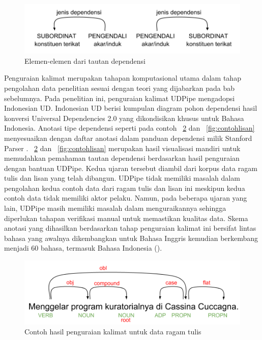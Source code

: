 \begin{figure}
	\centering \includegraphics[width=0.6
	\textwidth] {pics/tautandependensi.png} \caption{Elemen-elemen dari tautan dependensi} 
\label{fig:tautandependensi} \end{figure}

Penguraian kalimat merupakan tahapan komputasional utama dalam tahap pengolahan data penelitian sesuai dengan teori yang dijabarkan pada bab sebelumnya. Pada penelitian ini, penguraian kalimat UDPipe mengadopsi Indonesian UD. Indonesian UD berisi kumpulan diagram pohon dependensi hasil konversi Universal Dependencies 2.0 \citep{nivre2017universal} yang dikondisikan khusus untuk Bahasa Indonesia. Anotasi tipe dependensi seperti pada contoh \pic~\ref{fig:contohtulis} dan \pic~\ref{fig:contohlisan} menyesuaikan dengan daftar anotasi dalam panduan dependensi milik Stanford Parser \citep{de2008stanford}. \pic~\ref{fig:contohtulis} dan \pic~\ref{fig:contohlisan} merupakan hasil visualisasi mandiri untuk memudahkan pemahaman tautan dependensi berdasarkan hasil penguraian dengan bantuan UDPipe. Kedua ujaran tersebut diambil dari korpus data ragam tulis dan lisan yang telah dibangun. UDPipe tidak memiliki masalah dalam pengolahan kedua contoh data dari ragam tulis dan lisan ini meskipun kedua contoh data tidak memiliki aktor pelaku. Namun, pada beberapa ujaran yang lain, UDPipe masih memiliki masalah dalam menguraikannya sehingga diperlukan tahapan verifikasi manual untuk memastikan kualitas data. Skema anotasi yang dihasilkan berdasarkan tahap penguraian kalimat ini bersifat lintas bahasa yang awalnya dikembangkan untuk Bahasa Inggris kemudian berkembang menjadi 60 bahasa, termasuk Bahasa Indonesia (\citealp{de2008stanford, nivre2017universal}). 

\begin{figure}
	\centering \includegraphics[width=0.5
	\textwidth] {pics/contohtulis.png} \caption{Contoh hasil penguraian kalimat untuk data ragam tulis} 
\label{fig:contohtulis} \end{figure}

